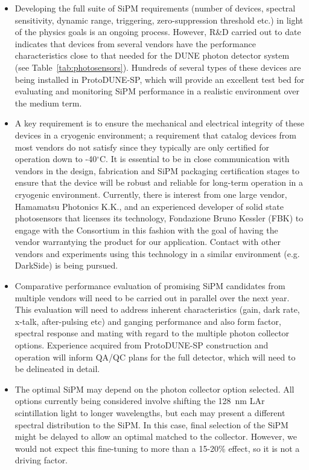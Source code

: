 \begin{itemize}

\item  Developing the full suite of SiPM requirements (number of devices, spectral sensitivity, dynamic range, triggering, 
zero-suppression threshold etc.) in light of the physics goals is an ongoing process. However, 
R\&D carried out to date indicates that devices from several vendors have the 
performance characteristics close to that needed for the DUNE photon detector
system (see Table~\ref{tab:photosensors}). Hundreds of several types of these devices are being installed in 
ProtoDUNE-SP, which will provide an excellent test bed for evaluating and monitoring SiPM
performance in a realistic environment over the medium term.

\item A key requirement is to ensure the mechanical and electrical 
integrity of these devices in a cryogenic environment;  a requirement that 
catalog devices from most vendors do not satisfy since they typically are only certified for operation 
down to -40$^\circ$C. It is essential to be in close communication with 
 vendors in the design, fabrication and SiPM packaging certification stages to ensure that the device will be robust and
reliable for long-term operation in a cryogenic environment. 
Currently, there is interest from one large vendor, Hamamatsu Photonics K.K., and an experienced developer of solid state 
photosensors that licenses its technology, Fondazione Bruno Kessler (FBK) 
to engage with the Consortium in this fashion with the goal of having the vendor warrantying the product
for our application. Contact with other vendors and experiments using this technology in a similar environment (e.g. DarkSide) is being pursued. 

\item Comparative performance evaluation of promising SiPM candidates from
multiple vendors will need to be carried out in parallel over the next year. This evaluation will need to
address inherent characteristics (gain, dark rate, x-talk, after-pulsing etc) and ganging 
performance and also form factor, spectral response and mating with regard to the
multiple photon collector options. Experience acquired from ProtoDUNE-SP construction
and operation will inform QA/QC plans for the full detector, which will need to be
delineated in detail.

\item The optimal SiPM may depend on the photon collector option selected.  All 
options currently being considered involve shifting the 128~nm LAr scintillation light to 
longer wavelengths, but each may present a different  spectral distribution to the SiPM. 
In this case, final selection of the SiPM might be delayed to allow an optimal matched to the collector. 
However, we would not expect this fine-tuning to more than a 15-20\% effect, so it is not a driving factor.


\end{itemize}
